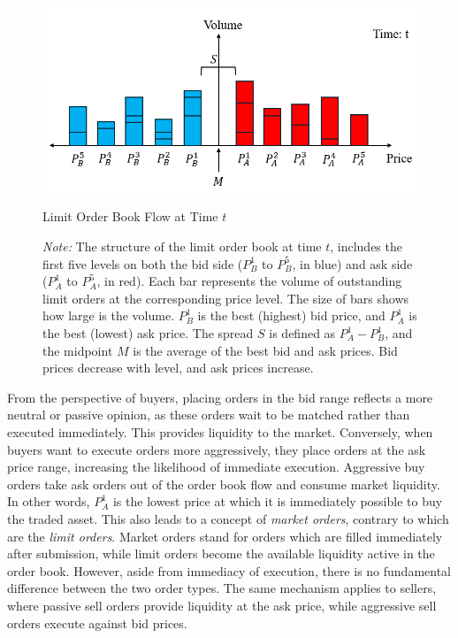 \begin{figure}[h]
    \centering
    \includegraphics[width=0.8\linewidth]{figures/order_book_t.png}
    \caption{Limit Order Book Flow at Time $t$} 
    \caption*{\textit{Note:} The structure of the limit order book at time $t$, includes the first five levels on both the bid side ($P_B^1$ to $P_B^5$, in blue) and ask side ($P_A^1$ to $P_A^5$, in red). Each bar represents the volume of outstanding limit orders at the corresponding price level. The size of bars shows how large is the volume. $P_B^1$ is the best (highest) bid price, and $P_A^1$ is the best (lowest) ask price. The spread $S$ is defined as $P_A^1 - P_B^1$, and the midpoint $M$ is the average of the best bid and ask prices. Bid prices decrease with level, and ask prices increase. }
    \label{fig: order_book_t}
\end{figure}

From the perspective of buyers, placing orders in the bid range reflects a more neutral or passive opinion, as these orders wait to be matched rather than executed immediately. This provides liquidity to the market. Conversely, when buyers want to execute orders more aggressively, they place orders at the ask price range, increasing the likelihood of immediate execution. Aggressive buy orders take ask orders out of the order book flow and consume market liquidity. In other words, $P_A ^ {1}$ is the lowest price at which it is immediately possible to buy the traded asset. This also leads to a concept of \textit{market orders}, contrary to which are the \textit{limit orders}. Market orders stand for orders which are filled immediately after submission, while limit orders become the available liquidity active in the order book. However, aside from immediacy of execution, there is no fundamental difference between the two order types. The same mechanism applies to sellers, where passive sell orders provide liquidity at the ask price, while aggressive sell orders execute against bid prices.

